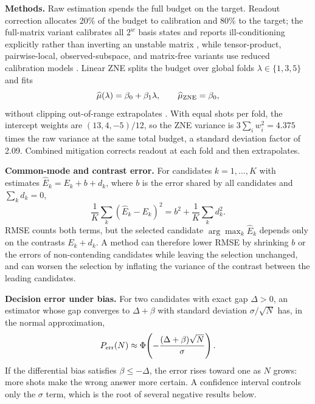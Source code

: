 \documentclass[10pt,twocolumn]{article}
\newcommand{\paragraphlead}[1]{\textbf{#1}\quad}
\begin{document}
\paragraphlead{Methods.}
Raw estimation spends the full budget on the target. Readout correction allocates 20\% of the
budget to calibration and 80\% to the target; the full-matrix variant calibrates all $2^w$ basis
states and reports ill-conditioning explicitly rather than inverting an unstable matrix
\cite{bravyi2021}, while tensor-product, pairwise-local, observed-subspace, and matrix-free variants
use reduced calibration models \cite{nation2021}. Linear ZNE splits the budget over global folds
$\lambda\in\{1,3,5\}$ and fits
\begin{equation}
\widehat\mu(\lambda)=\beta_0+\beta_1\lambda,\qquad \widehat\mu_{\rm ZNE}=\beta_0,
\label{eq:zne}
\end{equation}
without clipping out-of-range extrapolates \cite{giurgica2020}. With equal shots per fold, the
intercept weights are $(13,4,-5)/12$, so the ZNE variance is $3\sum_i w_i^2=4.375$ times the raw
variance at the same total budget, a standard deviation factor of 2.09. Combined mitigation
corrects readout at each fold and then extrapolates.

\paragraphlead{Common-mode and contrast error.}
For candidates $k=1,\dots,K$ with estimates $\widehat E_k=E_k+b+d_k$, where $b$ is the error
shared by all candidates and $\sum_k d_k=0$,
\begin{equation}
\frac{1}{K}\sum_k(\widehat E_k-E_k)^2=b^2+\frac{1}{K}\sum_k d_k^2 .
\label{eq:decomposition}
\end{equation}
RMSE counts both terms, but the selected candidate $\arg\max_k\widehat E_k$ depends only on the
contrasts $E_k+d_k$. A method can therefore lower RMSE by shrinking $b$ or the errors of non-contending candidates while
leaving the selection unchanged, and can worsen the selection by inflating the variance of the
contrast between the leading candidates.

\paragraphlead{Decision error under bias.}
For two candidates with exact gap $\Delta>0$, an estimator whose gap converges to $\Delta+\beta$
with standard deviation $\sigma/\sqrt{N}$ has, in the normal approximation,
\begin{equation}
P_{\rm err}(N)\approx\Phi\!\left(-\frac{(\Delta+\beta)\sqrt N}{\sigma}\right).
\label{eq:decision}
\end{equation}
If the differential bias satisfies $\beta\le-\Delta$, the error rises toward one as $N$ grows:
more shots make the wrong answer more certain. A confidence interval controls only the $\sigma$
term, which is the root of several negative results below.
\end{document}
